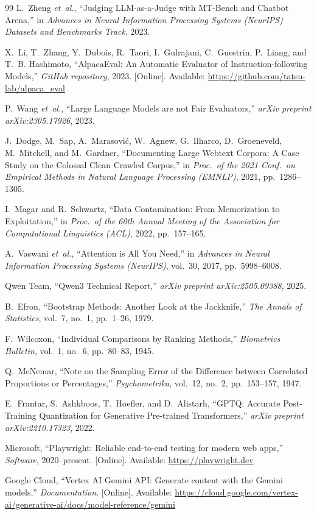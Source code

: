\documentclass[12pt,a4paper]{report}
\begin{document}
\begin{thebibliography}{99}
L.~Zheng \textit{et~al.}, ``Judging LLM-as-a-Judge with MT-Bench and Chatbot Arena,'' in \textit{Advances in Neural Information Processing Systems (NeurIPS) Datasets and Benchmarks Track}, 2023.

X.~Li, T.~Zhang, Y.~Dubois, R.~Taori, I.~Gulrajani, C.~Guestrin, P.~Liang, and T.~B. Hashimoto, ``AlpacaEval: An Automatic Evaluator of Instruction-following Models,'' \textit{GitHub repository}, 2023. [Online]. Available: \url{https://github.com/tatsu-lab/alpaca_eval}

P.~Wang \textit{et~al.}, ``Large Language Models are not Fair Evaluators,'' \textit{arXiv preprint arXiv:2305.17926}, 2023.

J.~Dodge, M.~Sap, A.~Marasovi\'c, W.~Agnew, G.~Ilharco, D.~Groeneveld, M.~Mitchell, and M.~Gardner, ``Documenting Large Webtext Corpora: A Case Study on the Colossal Clean Crawled Corpus,'' in \textit{Proc.\ of the 2021 Conf.\ on Empirical Methods in Natural Language Processing (EMNLP)}, 2021, pp.~1286--1305.

I.~Magar and R.~Schwartz, ``Data Contamination: From Memorization to Exploitation,'' in \textit{Proc.\ of the 60th Annual Meeting of the Association for Computational Linguistics (ACL)}, 2022, pp.~157--165.

A.~Vaswani \textit{et~al.}, ``Attention is All You Need,'' in \textit{Advances in Neural Information Processing Systems (NeurIPS)}, vol.~30, 2017, pp.~5998--6008.

Qwen Team, ``Qwen3 Technical Report,'' \textit{arXiv preprint arXiv:2505.09388}, 2025.

B.~Efron, ``Bootstrap Methods: Another Look at the Jackknife,'' \textit{The Annals of Statistics}, vol.~7, no.~1, pp.~1--26, 1979.

F.~Wilcoxon, ``Individual Comparisons by Ranking Methods,'' \textit{Biometrics Bulletin}, vol.~1, no.~6, pp.~80--83, 1945.

Q.~McNemar, ``Note on the Sampling Error of the Difference between Correlated Proportions or Percentages,'' \textit{Psychometrika}, vol.~12, no.~2, pp.~153--157, 1947.

E.~Frantar, S.~Ashkboos, T.~Hoefler, and D.~Alistarh, ``GPTQ: Accurate Post-Training Quantization for Generative Pre-trained Transformers,'' \textit{arXiv preprint arXiv:2210.17323}, 2022.

Microsoft, ``Playwright: Reliable end-to-end testing for modern web apps,'' \textit{Software}, 2020--present. [Online]. Available: \url{https://playwright.dev}

Google Cloud, ``Vertex AI Gemini API: Generate content with the Gemini models,'' \textit{Documentation}. [Online]. Available: \url{https://cloud.google.com/vertex-ai/generative-ai/docs/model-reference/gemini}

\end{thebibliography}
\end{document}
